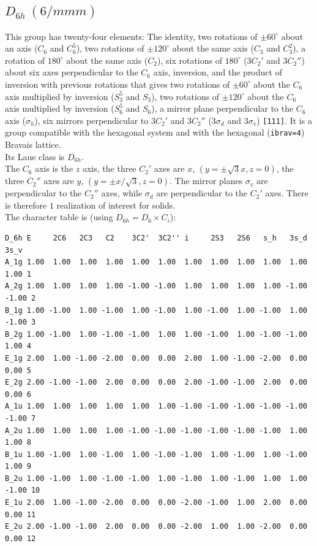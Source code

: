 \documentclass[12pt,a4paper]{article}
\begin{document}
\subsection{\color{web-blue}$D_{6h}\ (6/mmm)$} 
This group has twenty-four elements: The identity, two rotations of 
$\pm60^\circ$ about an axis ($C_6$ and $C_6^5$), two rotations of 
$\pm120^\circ$ about the same axis ($C_3$ and $C_3^2$), a rotation of 
$180^\circ$ about the same axis ($C_2$), six rotations of $180^\circ$ 
($3C_2'$ and $3C_2''$) about six axes perpendicular to the $C_6$ axis,
inversion, and the product of inversion with previous rotations that gives
two rotations of $\pm60^\circ$ about the
$C_6$ axis multiplied by inversion ($S_3^5$ and $S_3$), two rotations of 
$\pm120^\circ$ about the $C_6$ axis multiplied by inversion 
($S_6^5$ and $S_6$), a mirror plane 
perpendicular to the $C_6$ axis ($\sigma_h$), six mirrors perpendicular 
to $3C_2'$ and $3C_2''$ ($3\sigma_d$ and $3\sigma_v$) \texttt{[111]}.
It is a group compatible with the hexagonal system
and with the hexagonal (\texttt{ibrav=4}) Bravais lattice. \\
Its Laue class is $D_{6h}$. \\
The $C_6$ axis is the $z$ axis, the three $C_2'$ axes are 
$x$, $(y=\pm\sqrt{3}x, z=0)$, the three $C_2''$ axes
are $y$, $(y=\pm x/\sqrt{3}, z=0)$. The mirror planes
$\sigma_v$ are perpendicular to the $C_2''$ axes, while $\sigma_d$ are
perpendicular to the $C_2'$ axes. There is therefore $1$ realization
of interest for solids. \\
The character table is (using $D_{6h}=D_6 \times C_i$):
\begin{verbatim}
D_6h E     2C6   2C3   C2    3C2'  3C2'' i     2S3   2S6   s_h   3s_d  3s_v 
A_1g 1.00  1.00  1.00  1.00  1.00  1.00  1.00  1.00  1.00  1.00  1.00  1.00 1
A_2g 1.00  1.00  1.00  1.00 -1.00 -1.00  1.00  1.00  1.00  1.00 -1.00 -1.00 2
B_1g 1.00 -1.00  1.00 -1.00  1.00 -1.00  1.00 -1.00  1.00 -1.00  1.00 -1.00 3
B_2g 1.00 -1.00  1.00 -1.00 -1.00  1.00  1.00 -1.00  1.00 -1.00 -1.00  1.00 4
E_1g 2.00  1.00 -1.00 -2.00  0.00  0.00  2.00  1.00 -1.00 -2.00  0.00  0.00 5
E_2g 2.00 -1.00 -1.00  2.00  0.00  0.00  2.00 -1.00 -1.00  2.00  0.00  0.00 6
A_1u 1.00  1.00  1.00  1.00  1.00  1.00 -1.00 -1.00 -1.00 -1.00 -1.00 -1.00 7
A_2u 1.00  1.00  1.00  1.00 -1.00 -1.00 -1.00 -1.00 -1.00 -1.00  1.00  1.00 8
B_1u 1.00 -1.00  1.00 -1.00  1.00 -1.00 -1.00  1.00 -1.00  1.00 -1.00  1.00 9
B_2u 1.00 -1.00  1.00 -1.00 -1.00  1.00 -1.00  1.00 -1.00  1.00  1.00 -1.00 10
E_1u 2.00  1.00 -1.00 -2.00  0.00  0.00 -2.00 -1.00  1.00  2.00  0.00  0.00 11
E_2u 2.00 -1.00 -1.00  2.00  0.00  0.00 -2.00  1.00  1.00 -2.00  0.00  0.00 12
\end{verbatim}
\end{document}
